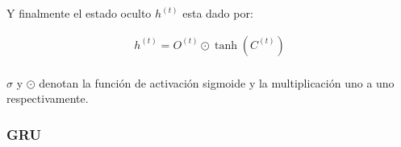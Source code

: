 Y finalmente el estado oculto $h^{(t)}$ esta dado por:

\begin{equation}
    \begin{split}
        h^{(t)} =  O^{(t)} \odot \tanh(C^{(t)}) \\
    \end{split}
\end{equation}

$\sigma$ y $\odot$ denotan la función de activación sigmoide y la multiplicación uno a uno
respectivamente.


\subsubsection{GRU}
